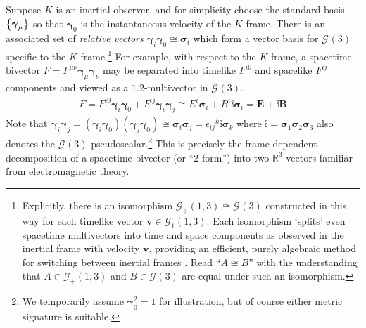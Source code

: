 \documentclass[12pt,a4paper]{article}
\renewcommand{\vb}[1]{\boldsymbol{#1}}
\newcommand{\vg}[1]{\vb{\gamma}_{#1}}
\newcommand{\vs}[1]{\vb{\sigma}_{#1}}
\newcommand{\GA}[1][]{\mathcal{G}_{#1}}
\newcommand{\vol}{\mathbb{i}}
\newcommand{\RR}{\mathds{R}}
\begin{document}
Suppose $K$ is an inertial observer, and for simplicity choose the standard basis $\qty{\vg \mu{}}$ so that $\vg 0$ is the instantaneous velocity of the $K$ frame.
There is an associated set of \emph{relative vectors} $\vg i\vg 0 \cong{} \vs i$ which form a vector basis for $\GA(3)$ specific to the $K$ frame.\footnote{
	Explicitly, there is an isomorphism $\GA[+](1,3) \cong{} \GA(3)$ constructed in this way for each timelike vector $\vb{v}{} \in{} \GA[1](1,3)$.
	Each isomorphism `splits' even spacetime multivectors into time and space components as observed in the inertial frame with velocity $\vb{v}{}$, providing an efficient, purely algebraic method for switching between inertial frames \cite{hestenes2003sta}.
	Read ``$A \cong B$'' with the understanding that $A \in \GA[+](1,3)$ and $B \in \GA(3)$ are equal under such an isomorphism.
}
For example, with respect to the $K$ frame, a spacetime bivector $F = F^{\mu{}\nu{}}\vg \mu{}\vg \nu{}$ may be separated into timelike $F^{i0}$ and spacelike $F^{ij}$ components and viewed as a $\qty{1,2}$-multivector in $\GA(3)$.
\begin{align}
	F = F^{i0}\vg i\vg 0 + F^{ij}\vg i\vg j
	\cong{} E^i\vs i + B^i\vol\vs i = \vb{E}{} + \vol \vb{B}{}
	\label{eqn:bivector-spacetime-split}
\end{align}
Note that
\begin{math}
	\vg i\vg j
	= (\vg i\vg 0)(\vg j\vg 0)
	\cong{}
	\vs i\vs j
	= \epsilon{}_{ij}{}^k\vol\vs k
\end{math}
where $\vol = \vs1\vs2\vs3$ also denotes the $\GA(3)$ pseudoscalar.\footnote{
	We temporarily assume $\vg0^2 = 1$ for illustration, but of course either metric signature is suitable.
}
This is precisely the frame-dependent decomposition of a spacetime bivector (or ``2-form'') into two $\RR^3$ vectors familiar from electromagnetic theory.
\end{document}
